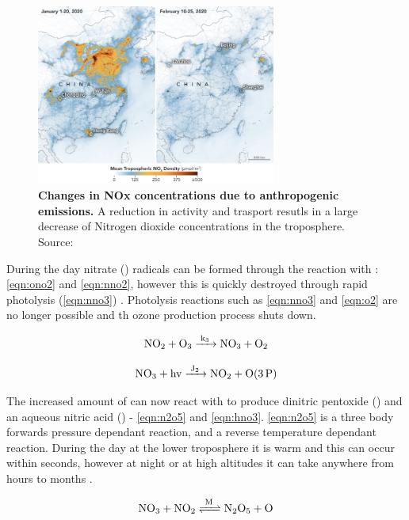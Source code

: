 \begin{figure}[H]
    \centering
    \includegraphics[width=0.7\textwidth]{china_trop_2020056.png}
    \caption{\textbf{Changes in NOx concentrations due to anthropogenic emissions.} A reduction in activity and trasport resutls in a large decrease of Nitrogen dioxide concentrations in the troposphere. Source: \citep{chinanox}}
    \label{fig:chinanox}
\end{figure}

During the day nitrate () radicals can be formed through the reaction with : \autoref{eqn:ono2} and \autoref{eqn:nno2}, however this is quickly destroyed through rapid photolysis (\autoref{eqn:nno3}) \citep{nitrate}. Photolysis reactions such as \autoref{eqn:nno3} and \autoref{eqn:o2} are no longer possible and th ozone production process shuts down.

\begin{equation}
  \ce{NO2 + O3 ->[k3] NO3 + O2}
  \label{eqn:nno2}
\end{equation}

\begin{equation}
  \ce{NO3 + hv ->[J2] NO2 + O(3P)}
  \label{eqn:nno3}
\end{equation}


 The increased amount of  can now react with  to produce dinitric pentoxide () and an aqueous nitric acid () - \autoref{eqn:n2o5} and \autoref{eqn:hno3}. \autoref{eqn:n2o5} is a three body forwards pressure dependant reaction, and a reverse temperature dependant reaction. During the day at the lower troposphere it is warm and this can occur within seconds, however at night or at high altitudes it can take anywhere from hours to months \citep{fundamentals}.


\begin{equation}
  \ce{NO3 + NO2 <=>[M] N2O5 + O}
  \label{eqn:n2o5}
\end{equation}

